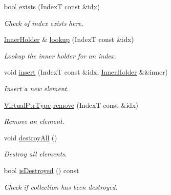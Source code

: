 \begin{DoxyCompactItemize}
\item 
bool \hyperlink{structvt_1_1vrt_1_1collection_1_1_holder_a15b1f2f386c124191f01400fecf24464}{exists} (IndexT const \&idx)
\begin{DoxyCompactList}\small\item\em Check of index exists here. \end{DoxyCompactList}\item 
\hyperlink{structvt_1_1vrt_1_1collection_1_1_holder_aafc9b515450179bad7f03e17010b59f8}{Inner\+Holder} \& \hyperlink{structvt_1_1vrt_1_1collection_1_1_holder_a68c05b8ae4f8755eb388f50da5c9553b}{lookup} (IndexT const \&idx)
\begin{DoxyCompactList}\small\item\em Lookup the inner holder for an index. \end{DoxyCompactList}\item 
void \hyperlink{structvt_1_1vrt_1_1collection_1_1_holder_a67967ed879eafbbb2e8bb1230bc38874}{insert} (IndexT const \&idx, \hyperlink{structvt_1_1vrt_1_1collection_1_1_holder_aafc9b515450179bad7f03e17010b59f8}{Inner\+Holder} \&\&inner)
\begin{DoxyCompactList}\small\item\em Insert a new element. \end{DoxyCompactList}\item 
\hyperlink{structvt_1_1vrt_1_1collection_1_1_holder_a04ba57a7b2c48ce6b4c90d3f3b33f43c}{Virtual\+Ptr\+Type} \hyperlink{structvt_1_1vrt_1_1collection_1_1_holder_ae2cd807c3b44832151b7f7d05a07e879}{remove} (IndexT const \&idx)
\begin{DoxyCompactList}\small\item\em Remove an element. \end{DoxyCompactList}\item 
void \hyperlink{structvt_1_1vrt_1_1collection_1_1_holder_ae4bd4f8f82713c8b4b2ea0b472fe7192}{destroy\+All} ()
\begin{DoxyCompactList}\small\item\em Destroy all elements. \end{DoxyCompactList}\item 
bool \hyperlink{structvt_1_1vrt_1_1collection_1_1_holder_a974126763d197024453d3ed2dcc9d215}{is\+Destroyed} () const
\begin{DoxyCompactList}\small\item\em Check if collection has been destroyed. \end{DoxyCompactList}\item 

\end{DoxyCompactItemize}
